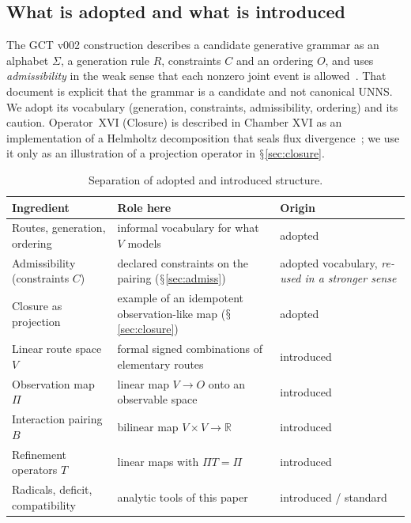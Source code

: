 \documentclass[11pt,a4paper]{article}
\renewcommand{\S}{\ensuremath{\mathsection}}
\newcommand{\RR}{\mathbb{R}}
\theoremstyle{plain}
\theoremstyle{definition}
\begin{document}
\subsection{What is adopted and what is introduced}\label{sec:adopt}
The GCT v002 construction describes a candidate generative grammar as an alphabet $\Sigma$, a generation rule $R$, constraints $C$ and an ordering $O$, and uses \emph{admissibility} in the weak sense that each nonzero joint event is allowed~\cite{G3}.
That document is explicit that the grammar is a candidate and not canonical UNNS.
We adopt its vocabulary (generation, constraints, admissibility, ordering) and its caution.
Operator~XVI (Closure) is described in Chamber XVI as an implementation of a Helmholtz decomposition that seals flux divergence~\cite{G7}; we use it only as an illustration of a projection operator in \S\ref{sec:closure}.

\begin{table}[t]
\centering\small
\begin{tabularx}{\textwidth}{@{}p{}Xp{}@{}}
\toprule
Ingredient & Role here & Origin\\
\midrule
Routes, generation, ordering & informal vocabulary for what $V$ models & adopted~\cite{G3}\\
Admissibility (constraints $C$) & declared constraints on the pairing (\S\ref{sec:admiss}) & adopted vocabulary, \emph{re-used in a stronger sense}\\
Closure as projection & example of an idempotent observation-like map (\S\ref{sec:closure}) & adopted~\cite{G7,G5}\\
Linear route space $V$ & formal signed combinations of elementary routes & introduced\\
Observation map $\Pi$ & linear map $V\to O$ onto an observable space & introduced\\
Interaction pairing $B$ & bilinear map $V\times V\to\RR$ & introduced\\
Refinement operators $T$ & linear maps with $\Pi T=\Pi$ & introduced\\
Radicals, deficit, compatibility & analytic tools of this paper & introduced / standard\\
\bottomrule
\end{tabularx}
\caption{Separation of adopted and introduced structure.}\label{tab:adopt}
\end{table}
\end{document}
